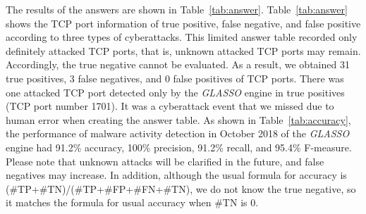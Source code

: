 \documentclass[conference]{IEEEtran}
\begin{document}
The results of the answers are shown in Table~\ref{tab:answer}.
Table~\ref{tab:answer} shows the TCP port information of true positive, false negative, and false positive according to three types of cyberattacks.
This limited answer table recorded only definitely attacked TCP ports, that is, unknown attacked TCP ports may remain.
Accordingly, the true negative cannot be evaluated.
As a result, we obtained 31 true positives, 3 false negatives, and 0 false positives of TCP ports.
There was one attacked TCP port detected only by the \textit{GLASSO} engine in true positives (TCP port number 1701).
It was a cyberattack event that we missed due to human error when creating the answer table.
As shown in Table~\ref{tab:accuracy}, the performance of malware activity detection in October 2018 of the \textit{GLASSO} engine had 91.2\% accuracy, 100\% precision, 91.2\% recall, and 95.4\% F-measure.
Please note that unknown attacks will be clarified in the future, and false negatives may increase.
In addition, although the usual formula for accuracy is (\#TP+\#TN)/(\#TP+\#FP+\#FN+\#TN), we do not know the true negative, so it matches the formula for usual accuracy when \#TN is 0.
\end{document}
